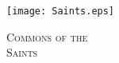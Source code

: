 \fancyhead[RE,LO]{}\fancyhead[RO,LE]{}
\fancyhead[C]{}\thispagestyle{empty}
{}
  \begin{center}
   \texttt{[image: Saints.eps]}
   \par
   \vspace{2ex}
   	\textsc{\Huge{Commons of the\\
   	Saints}}
   \end{center}